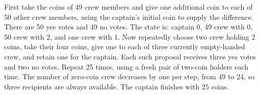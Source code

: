 First take the coins of 49 crew members and give one additional coin to each of 50 other crew members, using the captain's initial coin to supply the difference. There are 50 yes votes and 49 no votes. The state is: captain 0, 49 crew with 0, 50 crew with 2, and one crew with 1. Now repeatedly choose two crew holding 2 coins, take their four coins, give one to each of three currently empty-handed crew, and retain one for the captain. Each such proposal receives three yes votes and two no votes. Repeat 25 times, using a fresh pair of two-coin holders each time. The number of zero-coin crew decreases by one per step, from 49 to 24, so three recipients are always available. The captain finishes with $\boxed{25}$ coins.
